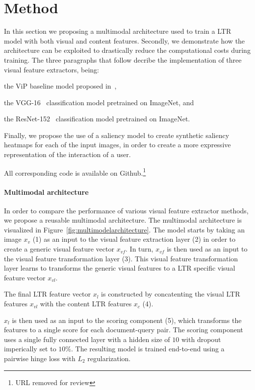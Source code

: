 
\section{Method}
In this section we proposing a multimodal architecture used to train a \ac{LTR} model with both visual and content features. 
Secondly, we demonstrate how the architecture can be exploited to drastically reduce the computational costs during training. 
The three paragraphs that follow decribe the implementation of three visual feature extractors, being:
\begin{inparaenum}[(i)]
\item the ViP baseline model proposed in~\citet{fan2017learning}, 
\item the VGG-16~\cite{simonyan2014very} classification model pretrained on ImageNet, and
\item the ResNet-152~\cite{he2016deep} classification model pretrained on ImageNet.
\end{inparaenum} 
Finally, we propose the use of a saliency model to create synthetic saliency heatmaps for each of the input images, in order to create a more expressive representation of the interaction of a user. 

All corresponding code is available on Github.\footnote{URL removed for review}

\paragraph{Multimodal architecture}
In order to compare the performance of various visual feature extractor methods, we propose a reusable multimodal architecture. 
The multimodal architecture is visualized in Figure~\ref{fig:multimodelarchitecture}. 
The model starts by taking an image $x_{v}$ (1) as an input to the visual feature extraction layer (2) in order to create a generic visual feature vector $x_{vf}$. In turn, $x_{vf}$ is then used as an input to the visual feature transformation layer (3).
This visual feature transformation layer learns to transforms the generic visual features to a \ac{LTR} specific visual feature vector $x_{vl}$.

The final \ac{LTR} feature vector $x_{l}$ is constructed by concatenting the visual \ac{LTR} features $x_{vl}$ with the content \ac{LTR} features $x_{c}$ (4). 

$x_{l}$ is then used as an input to the scoring component (5), which transforms the features to a single score for each document-query pair. The scoring component uses a single fully connected layer with a hidden size of $10$ with dropout imperically set to $10\%$. The resulting model is trained end-to-end using a pairwise hinge loss with $L_2$ regularization. 


